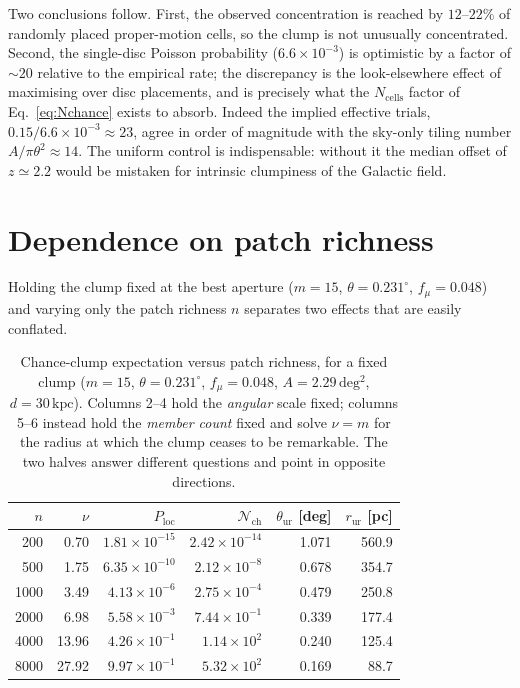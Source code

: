 \documentclass[11pt,a4paper]{article}
\newcommand{\unit}[1]{\ensuremath{\,\mathrm{#1}}}
\newcommand{\degsq}{\unit{deg^2}}
\newcommand{\Nchance}{\mathcal{N}_{\mathrm{ch}}}
\begin{document}
Two conclusions follow. First, the observed concentration is reached by
$12$--$22\%$ of randomly placed proper-motion cells, so the clump is not unusually
concentrated. Second, the single-disc Poisson probability ($6.6\times10^{-3}$) is
optimistic by a factor of $\sim20$ relative to the empirical rate; the discrepancy
is the look-elsewhere effect of maximising over disc placements, and is precisely
what the $N_{\mathrm{cells}}$ factor of Eq.~\eqref{eq:Nchance} exists to absorb.
Indeed the implied effective trials, $0.15/6.6\times10^{-3}\approx23$, agree in
order of magnitude with the sky-only tiling number $A/\pi\theta^{2}\approx14$. The
uniform control is indispensable: without it the median offset of $z\simeq2.2$
would be mistaken for intrinsic clumpiness of the Galactic field.

\section{Dependence on patch richness}

Holding the clump fixed at the best aperture ($m=15$, $\theta=0.231^\circ$,
$f_\mu=0.048$) and varying only the patch richness $n$ separates two effects that
are easily conflated.

\begin{table}[h]
\centering
\caption{Chance-clump expectation versus patch richness, for a fixed clump
($m=15$, $\theta=0.231^\circ$, $f_\mu=0.048$, $A=2.29\degsq$,
$d=30\unit{kpc}$). Columns 2--4 hold the \emph{angular} scale fixed; columns 5--6
instead hold the \emph{member count} fixed and solve $\nu=m$ for the radius at
which the clump ceases to be remarkable. The two halves answer different
questions and point in opposite directions.}
\label{tab:richness}
\small
\begin{tabular}{@{}r rrr rr@{}}
\toprule
$n$ & $\nu$ & $P_{\mathrm{loc}}$ & $\Nchance$
& $\theta_{\mathrm{ur}}$ [deg] & $r_{\mathrm{ur}}$ [pc] \\
\midrule
 200 &  0.70 & $1.81\times10^{-15}$ & $2.42\times10^{-14}$ & 1.071 & 560.9 \\
 500 &  1.75 & $6.35\times10^{-10}$ & $2.12\times10^{-8}$  & 0.678 & 354.7 \\
1000 &  3.49 & $4.13\times10^{-6}$  & $2.75\times10^{-4}$  & 0.479 & 250.8 \\
2000 &  6.98 & $5.58\times10^{-3}$  & $7.44\times10^{-1}$  & 0.339 & 177.4 \\
4000 & 13.96 & $4.26\times10^{-1}$  & $1.14\times10^{2}$   & 0.240 & 125.4 \\
8000 & 27.92 & $9.97\times10^{-1}$  & $5.32\times10^{2}$   & 0.169 &  88.7 \\
\bottomrule
\end{tabular}
\end{table}
\end{document}
